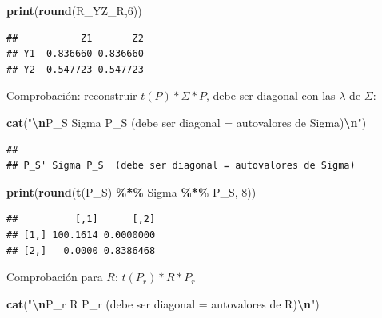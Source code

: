 \documentclass[
]{book}
\newenvironment{Shaded}{\begin{snugshade}}{\end{snugshade}}
\newcommand{\DecValTok}[1]{\textcolor[rgb]{0.00,0.00,0.81}{#1}}
\newcommand{\FunctionTok}[1]{\textcolor[rgb]{0.13,0.29,0.53}{\textbf{#1}}}
\newcommand{\NormalTok}[1]{#1}
\newcommand{\SpecialCharTok}[1]{\textcolor[rgb]{0.81,0.36,0.00}{\textbf{#1}}}
\newcommand{\StringTok}[1]{\textcolor[rgb]{0.31,0.60,0.02}{#1}}
\begin{document}
\begin{Shaded}
\begin{Highlighting}[]
\FunctionTok{print}\NormalTok{(}\FunctionTok{round}\NormalTok{(R\_YZ\_R,}\DecValTok{6}\NormalTok{))}
\end{Highlighting}
\end{Shaded}

\begin{verbatim}
##           Z1       Z2
## Y1  0.836660 0.836660
## Y2 -0.547723 0.547723
\end{verbatim}

Comprobación: reconstruir \(t(P) * \Sigma * P\), debe ser diagonal con las \(\lambda\) de \(\Sigma\):

\begin{Shaded}
\begin{Highlighting}[]
\FunctionTok{cat}\NormalTok{(}\StringTok{"}\SpecialCharTok{\textbackslash{}n}\StringTok{P\_S\textquotesingle{} Sigma P\_S  (debe ser diagonal = autovalores de Sigma)}\SpecialCharTok{\textbackslash{}n}\StringTok{"}\NormalTok{)}
\end{Highlighting}
\end{Shaded}

\begin{verbatim}
## 
## P_S' Sigma P_S  (debe ser diagonal = autovalores de Sigma)
\end{verbatim}

\begin{Shaded}
\begin{Highlighting}[]
\FunctionTok{print}\NormalTok{(}\FunctionTok{round}\NormalTok{(}\FunctionTok{t}\NormalTok{(P\_S) }\SpecialCharTok{\%*\%}\NormalTok{ Sigma }\SpecialCharTok{\%*\%}\NormalTok{ P\_S, }\DecValTok{8}\NormalTok{))}
\end{Highlighting}
\end{Shaded}

\begin{verbatim}
##          [,1]      [,2]
## [1,] 100.1614 0.0000000
## [2,]   0.0000 0.8386468
\end{verbatim}

Comprobación para \(R\): \(t(P_r) * R * P_r\)

\begin{Shaded}
\begin{Highlighting}[]
\FunctionTok{cat}\NormalTok{(}\StringTok{"}\SpecialCharTok{\textbackslash{}n}\StringTok{P\_r\textquotesingle{} R P\_r (debe ser diagonal = autovalores de R)}\SpecialCharTok{\textbackslash{}n}\StringTok{"}\NormalTok{)}
\end{Highlighting}
\end{Shaded}
\end{document}
